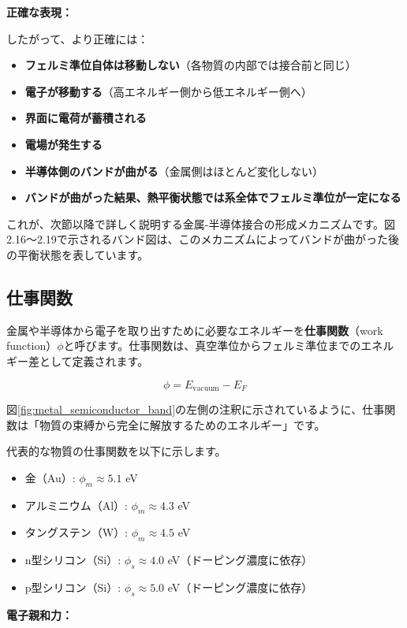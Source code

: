 \textbf{正確な表現：}

したがって、より正確には：
\begin{itemize}
\item \textbf{フェルミ準位自体は移動しない}（各物質の内部では接合前と同じ）
\item \textbf{電子が移動する}（高エネルギー側から低エネルギー側へ）
\item \textbf{界面に電荷が蓄積される}
\item \textbf{電場が発生する}
\item \textbf{半導体側のバンドが曲がる}（金属側はほとんど変化しない）
\item \textbf{バンドが曲がった結果、熱平衡状態では系全体でフェルミ準位が一定になる}
\end{itemize}

これが、次節以降で詳しく説明する金属-半導体接合の形成メカニズムです。図2.16〜2.19で示されるバンド図は、このメカニズムによってバンドが曲がった後の平衡状態を表しています。

\subsection{仕事関数}

金属や半導体から電子を取り出すために必要なエネルギーを\textbf{仕事関数}（work function）$\phi$と呼びます。仕事関数は、真空準位からフェルミ準位までのエネルギー差として定義されます。

\begin{equation}
\phi = E_{\text{vacuum}} - E_F
\end{equation}

図\ref{fig:metal_semiconductor_band}の左側の注釈に示されているように、仕事関数は「物質の束縛から完全に解放するためのエネルギー」です。

代表的な物質の仕事関数を以下に示します。
\begin{itemize}
\item 金（Au）: $\phi_m \approx 5.1$ eV
\item アルミニウム（Al）: $\phi_m \approx 4.3$ eV
\item タングステン（W）: $\phi_m \approx 4.5$ eV
\item n型シリコン（Si）: $\phi_s \approx 4.0$ eV（ドーピング濃度に依存）
\item p型シリコン（Si）: $\phi_s \approx 5.0$ eV（ドーピング濃度に依存）
\end{itemize}

\textbf{電子親和力：}

